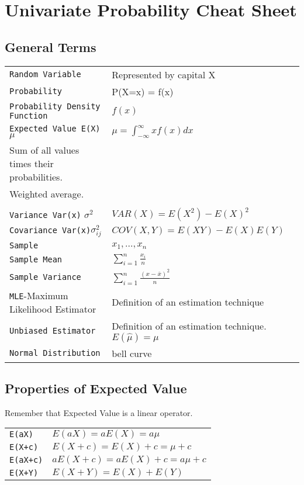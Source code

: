 \chapter{Univariate Probability Cheat Sheet}

\section{General Terms}
\begin{tabular}{@{}ll@{}}
\verb!Random Variable! & Represented by capital X \\
\verb!Probability!  & P(X=x)
= f(x) \\
\verb!Probability Density Function! & $f(x)$\\
\verb!Expected Value E(X)! $\mu$  & $\mu = \int_{-\infty}^{\infty}xf(x)dx$ \\
Sum of all values times their probabilities.\\ Weighted average.
\\\\
\verb!Variance Var(x)! $\sigma^2$ & $VAR(X)=E(X^2)-E(X)^2$ \\
\verb!Covariance Var(x)!$\sigma^2_{ij}$ & $COV(X,Y) = E(XY)-E(X)E(Y)$\\
\verb!Sample!  & $x_1,...,x_n$ \\
\verb!Sample Mean!  & $\displaystyle\sum_{i=1}^{n}\frac{x_i}{n}$ \\
\verb!Sample Variance!  &  
$\displaystyle\sum_{i=1}^{n} \frac{(x-\overline{x})^2}{n}$\\
\verb!MLE!-Maximum Likelihood Estimator  & Definition of an estimation technique\\
\verb!Unbiased Estimator!  & Definition of an estimation technique. $E(\hat \mu) = \mu$\\
\verb!Normal Distribution!  & bell curve\\
\end{tabular}

\section{Properties of Expected Value}
Remember that Expected Value is a linear operator.

\begin{tabular}{@{}ll@{}}
\verb!E(aX)!  & $E(aX)=aE(X)=a\mu$\\
\verb!E(X+c)!  & $E(X+c)=E(X)+c=\mu+c$\\
\verb!E(aX+c)!  & $aE(X+c)=aE(X)+c=a\mu+c$\\
\verb!E(X+Y)! &  $E(X+Y) = E(X)+E(Y)$
\end{tabular}

